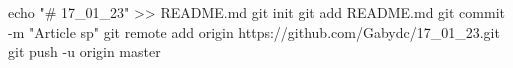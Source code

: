 echo "# 17_01_23" >> README.md
git init
git add README.md
git commit -m "Article sp"
git remote add origin https://github.com/Gabydc/17_01_23.git
git push -u origin master
